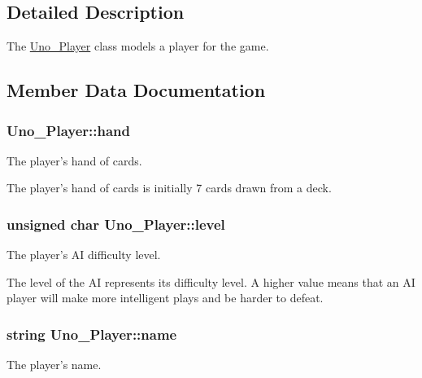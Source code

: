 \subsection{\-Detailed \-Description}
\-The \hyperlink{class_uno___player}{\-Uno\-\_\-\-Player} class models a player for the game. 

\subsection{\-Member \-Data \-Documentation}
\hypertarget{class_uno___player_a210acf259dc060d31139866fdaa91e98}{
\subsubsection[{hand}]{ {\bf \-Uno\-\_\-\-Player\-::hand}}}
\label{class_uno___player_a210acf259dc060d31139866fdaa91e98}


\-The player's hand of cards. 

\-The player's hand of cards is initially 7 cards drawn from a deck. \hypertarget{class_uno___player_acac0c2dc34e3ab51edc7525ca70b8bfb}{
\subsubsection[{level}]{\setlength{\rightskip}{0pt plus 5cm}unsigned char {\bf \-Uno\-\_\-\-Player\-::level}}}
\label{class_uno___player_acac0c2dc34e3ab51edc7525ca70b8bfb}


\-The player's \-A\-I difficulty level. 

\-The level of the \-A\-I represents its difficulty level. \-A higher value means that an \-A\-I player will make more intelligent plays and be harder to defeat. \hypertarget{class_uno___player_aae7371d13b426d5da6a290ab00590a17}{
\subsubsection[{name}]{\setlength{\rightskip}{0pt plus 5cm}string {\bf \-Uno\-\_\-\-Player\-::name}}}
\label{class_uno___player_aae7371d13b426d5da6a290ab00590a17}


\-The player's name. 

